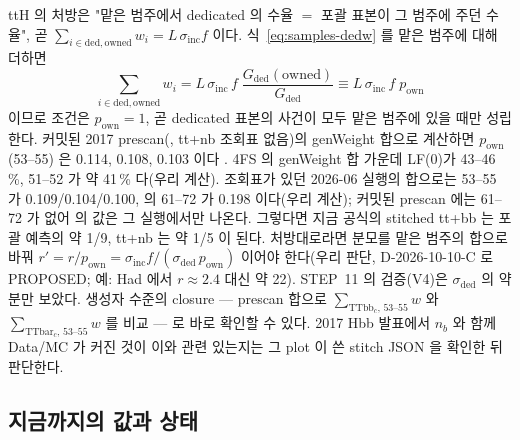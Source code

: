 \begin{note}
ttH 의 처방은 "맡은 범주에서 dedicated 의 수율 $=$ 포괄 표본이 그 범주에 주던 수율", 곧 $\sum_{i\in\mathrm{ded,owned}}w_i=L\,\sigma_{\mathrm{inc}}f$ 이다.
식~\eqref{eq:samples-dedw} 를 맡은 범주에 대해 더하면
\begin{equation}
  \sum_{i\in\mathrm{ded,owned}} w_i = L\,\sigma_{\mathrm{inc}}\,f\;\frac{G_{\mathrm{ded}}(\mathrm{owned})}{G_{\mathrm{ded}}} \equiv L\,\sigma_{\mathrm{inc}}\,f\;p_{\mathrm{own}}
  \label{eq:samples-pown}
\end{equation}
이므로 조건은 $p_{\mathrm{own}}=1$, 곧 dedicated 표본의 사건이 모두 맡은 범주에 있을 때만 성립한다. 커밋된 2017 prescan(,
tt+nb 조회표 없음)의 genWeight 합으로 계산하면 $p_{\mathrm{own}}$(53--55) 은  0.114,  0.108,  0.103 이다
. 4FS \ttbb 의 genWeight 합 가운데 LF(0)가 43--46\,\%, 51--52 가 약 41\,\% 다(우리 계산). 조회표가 있던 2026-06 실행의 합으로는 53--55 가
0.109/0.104/0.100,  의 61--72 가 0.198 이다(우리 계산); 커밋된 prescan 에는 61--72 가 없어  의 값은 그
실행에서만 나온다. 그렇다면 지금 공식의 stitched tt+bb 는 포괄 예측의 약 1/9, tt+nb 는 약 1/5 이 된다. 처방대로라면 분모를 맡은 범주의 합으로 바꿔
$r'=r/p_{\mathrm{own}}=\sigma_{\mathrm{inc}}f/(\sigma_{\mathrm{ded}}\,p_{\mathrm{own}})$ 이어야 한다(우리 판단, D-2026-10-10-C 로 PROPOSED; 예: Had 에서 $r\approx2.4$ 대신
약 22). STEP~11 의 검증(V4)은 $\sigma_{\mathrm{ded}}$ 의 약분만 보았다.
생성자 수준의 closure — prescan 합으로 $\sum_{\mathrm{TTbb}_c,\,53\text{--}55}w$ 와 $\sum_{\mathrm{TTbar}_c,\,53\text{--}55}w$ 를 비교 — 로 바로 확인할 수 있다.
2017 Hbb 발표에서 $n_b$ 와 함께 Data/MC 가 커진 것이 이와 관련 있는지는 그 plot 이 쓴 stitch JSON 을 확인한 뒤 판단한다.
\end{note}

\subsection{지금까지의 값과 상태}\label{sec:samples-stitch-values}

